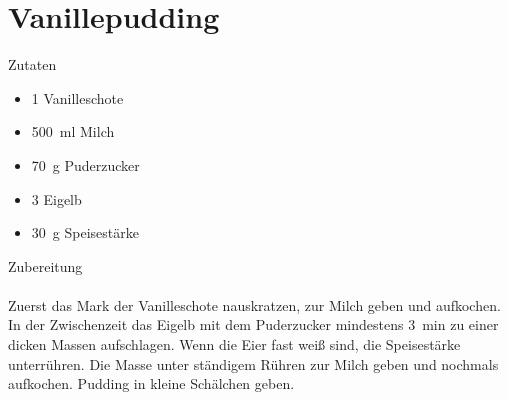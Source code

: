 \section*{Vanillepudding}
\ihead{}\ohead{}
\cfoot{}
{\Large Zutaten}
\begin{multicols}{2}
\begin{itemize}
    \item \num{1} Vanilleschote
    \item \SI{500}{ml} Milch
    \item \SI{70}{g} Puderzucker
    \item \num{3} Eigelb
    \item \SI{30}{g} Speisestärke
\end{itemize}
\end{multicols}
\noindent
{\Large Zubereitung}\\
\\
Zuerst das Mark der Vanilleschote nauskratzen, zur Milch geben und aufkochen.\\
In der Zwischenzeit das Eigelb mit dem Puderzucker mindestens \SI{3}{min} zu einer dicken Massen aufschlagen.
Wenn die Eier fast weiß sind, die Speisestärke unterrühren.
Die Masse unter ständigem Rühren zur Milch geben und nochmals aufkochen.
Pudding in kleine Schälchen geben.